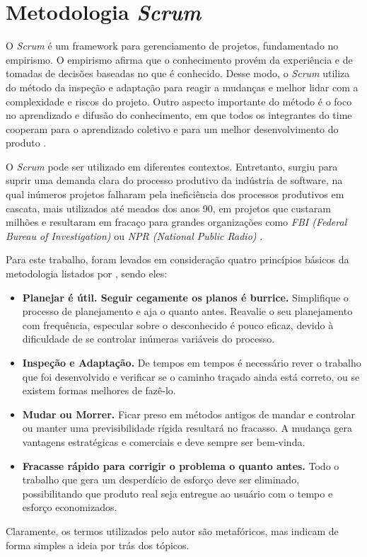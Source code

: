   

 

\section{Metodologia \textit{Scrum}}

O \textit{Scrum} é um framework para gerenciamento de projetos, fundamentado no empirismo. O empirismo afirma que o conhecimento provém da experiência e de tomadas de decisões baseadas no que é conhecido. Desse modo, o \textit{Scrum} utiliza do método da inspeção e adaptação para reagir a mudanças e melhor lidar com a complexidade e riscos do projeto. Outro aspecto importante do método é o foco no aprendizado e difusão do conhecimento, em que todos os integrantes do time cooperam para o aprendizado coletivo e para um melhor desenvolvimento do produto \cite{scrum2013}. 

O \textit{Scrum} pode ser utilizado em diferentes contextos. Entretanto, surgiu para suprir uma demanda clara do processo produtivo da indústria de software, na qual inúmeros projetos falharam pela ineficiência dos processos produtivos em cascata, mais utilizados até meados dos anos 90, em projetos que custaram milhões e resultaram em fracaço para grandes organizações como \textit{FBI (Federal Bureau of Investigation)} ou \textit{NPR (National Public Radio)} \cite{scrum2014}.

Para este trabalho, foram levados em consideração quatro princípios básicos da metodologia listados por \cite{scrum2014}, sendo eles: 
	\begin{itemize}
		\item \textbf{Planejar é útil. Seguir cegamente os planos é burrice.} Simplifique o processo de planejamento e aja o quanto antes. Reavalie o seu planejamento com frequência, especular sobre o desconhecido é pouco eficaz, devido à dificuldade de se controlar inúmeras variáveis do processo.
		\item \textbf{Inspeção e Adaptação.} De tempos em tempos é necessário rever o trabalho que foi desenvolvido e verificar se o caminho traçado ainda está correto, ou se existem formas melhores de fazê-lo.
		\item \textbf{Mudar ou Morrer.} Ficar preso em métodos antigos de mandar e controlar ou manter uma previsibilidade rígida resultará no fracasso. A mudança gera vantagens estratégicas e comerciais e deve sempre ser bem-vinda.
		\item \textbf{Fracasse rápido para corrigir o problema o quanto antes.} Todo o trabalho que gera um desperdício de esforço deve ser eliminado, possibilitando que produto real seja entregue ao usuário com o tempo e esforço economizados.
	\end{itemize}
	
Claramente, os termos utilizados pelo autor são metafóricos, mas indicam de forma simples a ideia por trás dos tópicos.
	

